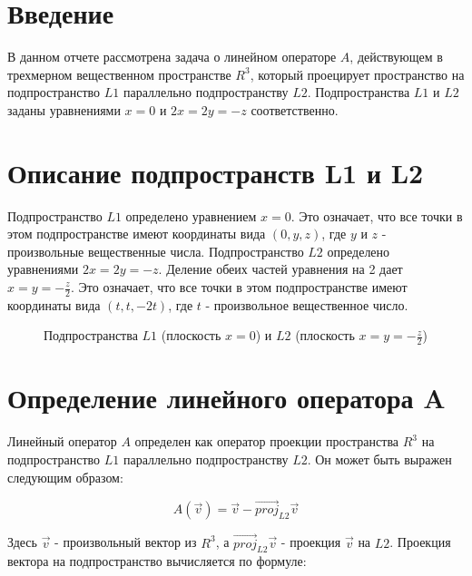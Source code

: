 \documentclass[12pt]{article}
\begin{document}
\section{Введение}
В данном отчете рассмотрена задача о линейном операторе $A$, действующем в трехмерном вещественном пространстве $R^3$, который проецирует пространство на подпространство $L1$ параллельно подпространству $L2$. Подпространства $L1$ и $L2$ заданы уравнениями $x = 0$ и $2x = 2y = -z$ соответственно.

\section{Описание подпространств L1 и L2}

Подпространство $L1$ определено уравнением $x = 0$. Это означает, что все точки в этом подпространстве имеют координаты вида $(0, y, z)$, где $y$ и $z$ - произвольные вещественные числа. Подпространство $L2$ определено уравнениями $2x = 2y = -z$. Деление обеих частей уравнения на 2 дает $x = y = -\frac{z}{2}$. Это означает, что все точки в этом подпространстве имеют координаты вида $(t, t, -2t)$, где $t$ - произвольное вещественное число.

\begin{figure}[h]
\centering
{}
\caption{Подпространства $L1$ (плоскость $x=0$) и $L2$ (плоскость $x=y=-\frac{z}{2}$)}
\end{figure}

\section{Определение линейного оператора A}
Линейный оператор $A$ определен как оператор проекции пространства $R^3$ на подпространство $L1$ параллельно подпространству $L2$. Он может быть выражен следующим образом:

\begin{equation}
A(\vec{v}) = \vec{v} - \vec{proj}_{L2}\vec{v}
\end{equation}

Здесь $\vec{v}$ - произвольный вектор из $R^3$, а $\vec{proj}_{L2}\vec{v}$ - проекция $\vec{v}$ на $L2$. Проекция вектора на подпространство вычисляется по формуле:
\end{document}

